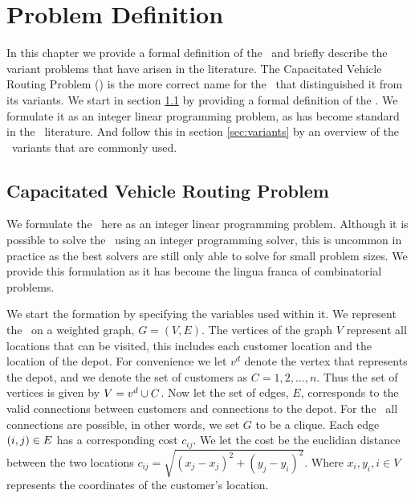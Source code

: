 
\chapter{Problem Definition}
\label{chap:pd}

In this chapter we provide a formal definition of the \VRP\ and briefly describe the variant problems that have arisen in the literature. The Capacitated Vehicle Routing Problem (\CVRP) is the more correct name for the \VRP\ that distinguished it from its variants. We start in section \ref{sec:capacitatedvehicleroutingproblem} by providing a formal definition of the \CVRP. We formulate it as an integer linear programming problem, as has become standard in the \VRP\ literature. And follow this in section \ref{sec:variants} by an overview of the \VRP\ variants that are commonly used.

\section{Capacitated Vehicle Routing Problem}
\label{sec:capacitatedvehicleroutingproblem}

We formulate the \CVRP\ here as an integer linear programming problem. Although it is possible to solve the \CVRP\ using an integer programming solver, this is uncommon in practice as the best solvers are still only able to solve for small problem sizes. We provide this formulation as it has become the lingua franca of combinatorial problems.

We start the formation by specifying the variables used within it. We represent the \CVRP\ on a weighted graph, $G = (V, E)$. The vertices of the graph $V$ represent all locations that can be visited, this includes each customer location and the location of the depot. For convenience we let $v^d$ denote the vertex that represents the depot, and we denote the set of customers as $C = 1,2,...,n$. Thus the set of vertices is given by $V = v^d \cup C$. Now let the set of edges, $E$, corresponds to the valid connections between customers and connections to the depot. For the \CVRP\ all connections are possible, in other words, we set $G$ to be a clique. Each edge $(i,j) \in E$ has a corresponding cost $c_{ij}$. We let the cost be the euclidian distance between the two locations $c_{ij} = \sqrt{(x_j - x_j)^2 + (y_j -  y_i)^2}$. Where $x_i, y_i, i \in V$ represents the coordinates of the customer's location. 

